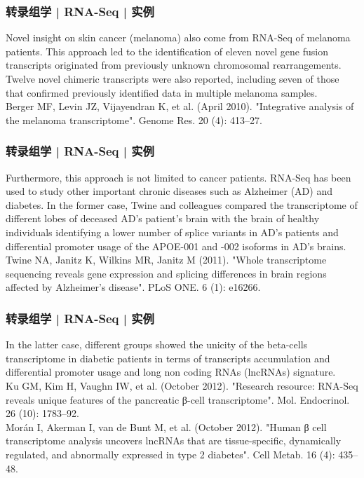 \begin{frame}
  \frametitle{转录组学 | RNA-Seq | 实例}
   Novel insight on skin cancer (melanoma) also come from RNA-Seq of melanoma patients. This approach led to the identification of eleven novel gene fusion transcripts originated from previously unknown chromosomal rearrangements. Twelve novel chimeric transcripts were also reported, including seven of those that confirmed previously identified data in multiple melanoma samples.\\
Berger MF, Levin JZ, Vijayendran K, et al. (April 2010). "Integrative analysis of the melanoma transcriptome". Genome Res. 20 (4): 413–27. 
\end{frame}

\begin{frame}
  \frametitle{转录组学 | RNA-Seq | 实例}
  Furthermore, this approach is not limited to cancer patients. RNA-Seq has been used to study other important chronic diseases such as Alzheimer (AD) and diabetes. In the former case, Twine and colleagues compared the transcriptome of different lobes of deceased AD's patient's brain with the brain of healthy individuals identifying a lower number of splice variants in AD's patients and differential promoter usage of the APOE-001 and -002 isoforms in AD's brains.\\
Twine NA, Janitz K, Wilkins MR, Janitz M (2011). "Whole transcriptome sequencing reveals gene expression and splicing differences in brain regions affected by Alzheimer's disease". PLoS ONE. 6 (1): e16266. 
\end{frame}

\begin{frame}
  \frametitle{转录组学 | RNA-Seq | 实例}
  In the latter case, different groups showed the unicity of the beta-cells transcriptome in diabetic patients in terms of transcripts accumulation and differential promoter usage and long non coding RNAs (lncRNAs) signature.\\
  Ku GM, Kim H, Vaughn IW, et al. (October 2012). "Research resource: RNA-Seq reveals unique features of the pancreatic β-cell transcriptome". Mol. Endocrinol. 26 (10): 1783–92.\\
  Morán I, Akerman I, van de Bunt M, et al. (October 2012). "Human β cell transcriptome analysis uncovers lncRNAs that are tissue-specific, dynamically regulated, and abnormally expressed in type 2 diabetes". Cell Metab. 16 (4): 435–48. 
\end{frame}

